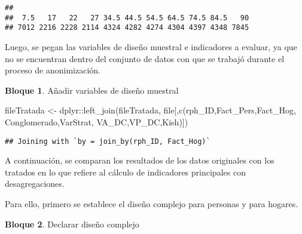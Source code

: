 \documentclass[
]{book}
\newenvironment{Shaded}{\begin{snugshade}}{\end{snugshade}}
\newcommand{\FunctionTok}[1]{\textcolor[rgb]{0.00,0.00,0.00}{#1}}
\newcommand{\NormalTok}[1]{#1}
\newcommand{\OtherTok}[1]{\textcolor[rgb]{0.56,0.35,0.01}{#1}}
\newcommand{\SpecialCharTok}[1]{\textcolor[rgb]{0.00,0.00,0.00}{#1}}
\newcommand{\StringTok}[1]{\textcolor[rgb]{0.31,0.60,0.02}{#1}}
\theoremstyle{definition}
\theoremstyle{definition}
\newtheorem{example}{Bloque}[chapter]
\theoremstyle{definition}
\theoremstyle{definition}
\theoremstyle{remark}
\begin{document}
\begin{verbatim}
## 
##  7.5   17   22   27 34.5 44.5 54.5 64.5 74.5 84.5   90 
## 7012 2216 2228 2114 4324 4282 4274 4304 4397 4348 7845
\end{verbatim}

Luego, se pegan las variables de diseño muestral e indicadores a evaluar, ya que no se encuentran dentro del conjunto de datos con que se trabajó durante el proceso de anonimización.

\begin{example}
\protect\hypertarget{exm:bloque74nbm}{}\label{exm:bloque74nbm}Añadir variables de diseño muestral
\end{example}

\begin{Shaded}
\begin{Highlighting}[]
\NormalTok{fileTratada }\OtherTok{\textless{}{-}}\NormalTok{ dplyr}\SpecialCharTok{::}\FunctionTok{left\_join}\NormalTok{(fileTratada,}
\NormalTok{                                file[,}\FunctionTok{c}\NormalTok{(}\StringTok{\textquotesingle{}rph\_ID\textquotesingle{}}\NormalTok{,}\StringTok{\textquotesingle{}Fact\_Pers\textquotesingle{}}\NormalTok{,}\StringTok{\textquotesingle{}Fact\_Hog\textquotesingle{}}\NormalTok{,}
                                        \StringTok{\textquotesingle{}Conglomerado\textquotesingle{}}\NormalTok{,}\StringTok{\textquotesingle{}VarStrat\textquotesingle{}}\NormalTok{,}
                                        \StringTok{\textquotesingle{}VA\_DC\textquotesingle{}}\NormalTok{,}\StringTok{\textquotesingle{}VP\_DC\textquotesingle{}}\NormalTok{,}\StringTok{\textquotesingle{}Kish\textquotesingle{}}\NormalTok{)])}
\end{Highlighting}
\end{Shaded}

\begin{verbatim}
## Joining with `by = join_by(rph_ID, Fact_Hog)`
\end{verbatim}

A continuación, se comparan los resultados de los datos originales con los tratados en lo que refiere al cálculo de indicadores principales con desagregaciones.

Para ello, primero se establece el diseño complejo para personas y para hogares.

\begin{example}
\protect\hypertarget{exm:bloque75nbm}{}\label{exm:bloque75nbm}Declarar diseño complejo
\end{example}
\end{document}
